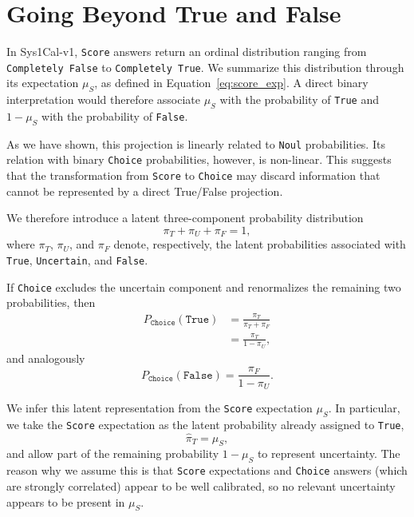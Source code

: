 \documentclass[twoside]{article}
\begin{document}


\section{Going Beyond True and False}

In Sys1Cal-v1, \texttt{Score} answers return an ordinal distribution
ranging from \texttt{Completely False} to \texttt{Completely True}.
We summarize this distribution through its expectation $\mu_S$, as
defined in Equation~\ref{eq:score_exp}. A direct binary interpretation
would therefore associate $\mu_S$ with the probability of
\texttt{True} and $1-\mu_S$ with the probability of \texttt{False}.

As we have shown, this projection is linearly related to
\texttt{Noul} probabilities. Its relation with binary
\texttt{Choice} probabilities, however, is non-linear.
This suggests that the transformation from \texttt{Score} to
\texttt{Choice} may discard information that cannot be represented by
a direct True/False projection.

We therefore introduce a latent three-component probability
distribution
\begin{equation*}
    \pi_T+\pi_U+\pi_F=1,
\end{equation*}
where $\pi_T$, $\pi_U$, and $\pi_F$ denote, respectively, the latent
probabilities associated with \texttt{True}, \texttt{Uncertain}, and
\texttt{False}.

If \texttt{Choice} excludes the uncertain component and renormalizes
the remaining two probabilities, then
\begin{align}
P_{\texttt{Choice}}(\texttt{True})
    &=
    \frac{\pi_T}{\pi_T+\pi_F}
    \\
    &=
    \frac{\pi_T}{1-\pi_U},
\label{eq:choice-renorm}
\end{align}
and analogously
\[
P_{\texttt{Choice}}(\texttt{False})
=
\frac{\pi_F}{1-\pi_U}.
\]

We infer this latent representation from the \texttt{Score}
expectation $\mu_S$. In particular, we take the \texttt{Score}
expectation as the latent probability already assigned to
\texttt{True},
\begin{equation}
    \widehat{\pi}_T=\mu_S,
\end{equation}
and allow part of the remaining probability $1-\mu_S$ to represent
uncertainty.
The reason why we assume this is that \texttt{Score}
expectations and \texttt{Choice} answers (which are strongly correlated) appear to be well calibrated, so no relevant uncertainty appears to be present in $\mu_S$.
\end{document}
